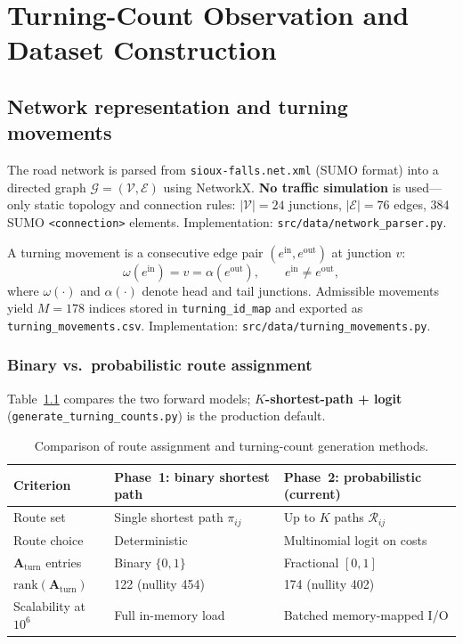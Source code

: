 \documentclass[11pt,a4paper]{report}
\newcommand{\Aturn}{\mathbf{A}_{\mathrm{turn}}}
\begin{document}
\chapter{Turning-Count Observation and Dataset Construction}
\label{ch:turning}

\section{Network representation and turning movements}
\label{sec:ch2-network}

The road network is parsed from \texttt{sioux-falls.net.xml} (SUMO format) into a directed graph $\mathcal{G}=(\mathcal{V},\mathcal{E})$ using NetworkX. \textbf{No traffic simulation} is used---only static topology and connection rules: $|\mathcal{V}|=24$ junctions, $|\mathcal{E}|=76$ edges, 384 SUMO \texttt{<connection>} elements. Implementation: \texttt{src/data/network\_parser.py}.

A turning movement is a consecutive edge pair $(e^{\mathrm{in}},e^{\mathrm{out}})$ at junction $v$:
\begin{equation}
    \omega(e^{\mathrm{in}})=v=\alpha(e^{\mathrm{out}}), \qquad e^{\mathrm{in}}\neq e^{\mathrm{out}},
    \label{eq:turn_def}
\end{equation}
where $\omega(\cdot)$ and $\alpha(\cdot)$ denote head and tail junctions. Admissible movements yield $M=178$ indices stored in \texttt{turning\_id\_map} and exported as \texttt{turning\_movements.csv}. Implementation: \texttt{src/data/turning\_movements.py}.

\subsection{Binary vs.\ probabilistic route assignment}

Table~\ref{tab:route_gen_compare} compares the two forward models; \textbf{$K$-shortest-path + logit} (\texttt{generate\_turning\_counts.py}) is the production default.

\begin{table}[ht]
\centering
\caption{Comparison of route assignment and turning-count generation methods.}
\label{tab:route_gen_compare}
\small
\begin{tabular}{@{}p{3.2cm}p{4.8cm}p{4.8cm}@{}}
\toprule
\textbf{Criterion} & \textbf{Phase~1: binary shortest path} & \textbf{Phase~2: probabilistic (current)} \\
\midrule
Route set & Single shortest path $\pi_{ij}$ & Up to $K$ paths $\mathcal{R}_{ij}$ \\
Route choice & Deterministic & Multinomial logit on costs \\
$\Aturn$ entries & Binary $\{0,1\}$ & Fractional $[0,1]$ \\
$\mathrm{rank}(\Aturn)$ & 122 (nullity 454) & 174 (nullity 402) \\
Scalability at $10^6$ & Full in-memory load & Batched memory-mapped I/O \\
\bottomrule
\end{tabular}
\end{table}
\end{document}

